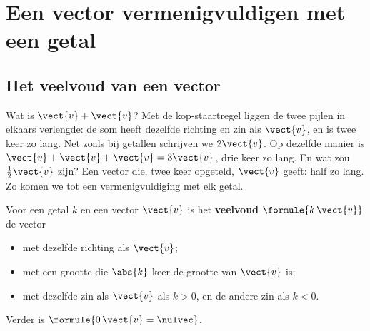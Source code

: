 \begin{oefeningen}
\end{oefeningen}

\section{Een vector vermenigvuldigen met een getal}

\subsection{Het veelvoud van een vector}

Wat is $\vect{v} + \vect{v}$? Met de kop-staartregel liggen de twee pijlen in elkaars verlengde: de som heeft dezelfde richting en zin als $\vect{v}$, en is twee keer zo lang. Net zoals bij getallen schrijven we $2\vect{v}$. Op dezelfde manier is $\vect{v} + \vect{v} + \vect{v} = 3\vect{v}$, drie keer zo lang. En wat zou $\tfrac12\vect{v}$ zijn? Een vector die, twee keer opgeteld, $\vect{v}$ geeft: half zo lang. Zo komen we tot een vermenigvuldiging met elk getal.

\begin{theorie}
\begin{minipage}[t]{.62\linewidth}
\vspace{0pt}
Voor een getal $k$ en een vector $\vect{v}$ is het \textbf{\textcolor{accent}{veelvoud}} $\formule{k\,\vect{v}}$ de vector
\begin{itemize}[nosep,leftmargin=5mm]
\item met dezelfde richting als $\vect{v}$;
\item met een grootte die $\abs{k}$ keer de grootte van $\vect{v}$ is;
\item met dezelfde zin als $\vect{v}$ als $k > 0$, en de andere zin als $k < 0$.
\end{itemize}
Verder is $\formule{0\,\vect{v} = \nulvec}$.
\end{minipage}\hfill
\begin{minipage}[t]{.34\linewidth}
\vspace{1mm}
\centering
{}
\end{minipage}
\end{theorie}

